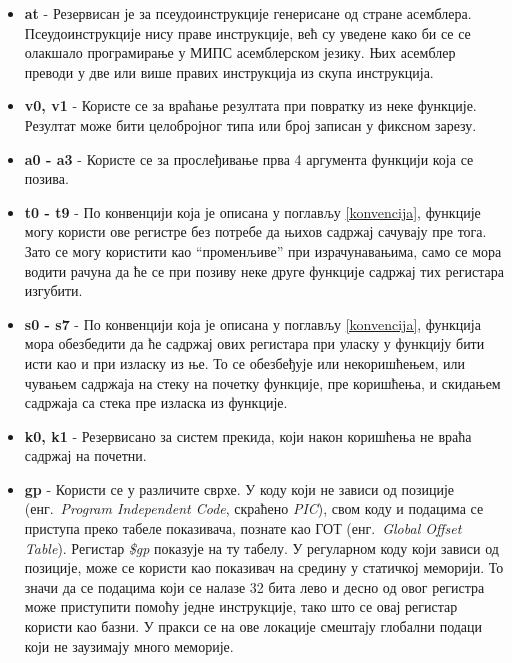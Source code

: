 \documentclass[12pt,oneside]{memoir}
\begin{document}
\begin{itemize}
\item \textbf{at} - Резервисан је за псеудоинструкције генерисане од стране асемблера. Псеудоинструкције нису праве инструкције, већ су уведене како би се се олакшало програмирање у МИПС асемблерском језику. Њих асемблер преводи у две или више правих инструкција из скупа инструкција.

\item \textbf{v0, v1} - Користе се за враћање резултата при повратку из неке функције. Резултат може бити целобројног типа или број записан у фиксном зарезу.

\item \textbf{a0 - a3} - Користе се за прослеђивање прва 4 аргумента функцији која се позива. 

\item \textbf{t0 - t9} - По конвенцији која је описана у поглављу \ref{konvencija}, функције могу користи ове регистре без потребе да њихов садржај сачувају пре тога. Зато се могу користити као “променљиве” при израчунавањима, само се мора водити рачуна да ће се при позиву неке друге функције садржај тих регистара изгубити.

\item \textbf{s0 - s7} - По конвенцији која је описана у поглављу \ref{konvencija}, функција мора обезбедити да ће садржај ових регистара при уласку у функцију бити исти као и при изласку из ње. То се обезбеђује или некоришћењем, или чувањем садржаја на стеку на почетку функције, пре коришћења, и скидањем садржаја са стека пре изласка из функције.

\item \textbf{k0, k1} - Резервисано за систем прекида, који након коришћења не враћа садржај на почетни.

\item \textbf{gp} - Користи се у различите сврхе. У коду који не зависи од позиције (енг.~\textit{Program Independent Code}, скраћено \textit{PIC}), свом коду и подацима се приступа преко табеле показивача, познате као ГОТ (енг.~\textit{Global Offset Table}). Регистар \textit{\$gp} показује на ту табелу.
У регуларном коду који зависи од позиције, може се користи као показивач на средину у статичкој меморији. То значи да се подацима који се налазе 32 бита лево и десно од овог регистра може приступити помоћу једне инструкције, тако што се овај регистар користи као базни. У пракси се на ове локације смештају глобални подаци који не заузимају много меморије.


\end{itemize}
\end{document}
